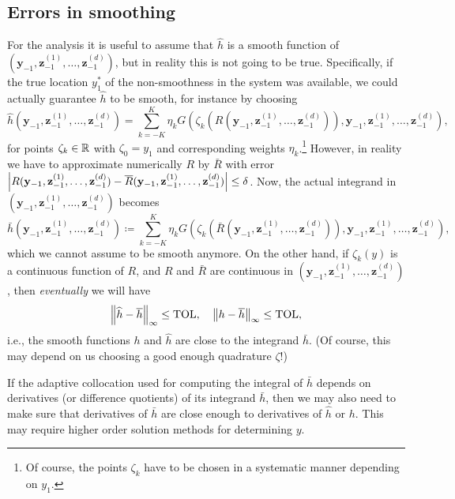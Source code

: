 \subsection{Errors in smoothing}
\label{sec:errors-smoothing}

For the analysis it is useful to assume that $\hat{h}$ is a smooth function of $(\mathbf{y}_{-1},\mathbf{z}^{(1)}_{-1},\dots,\mathbf{z}^{(d)}_{-1} )$, but in reality this is not going to be true. Specifically, if the true location $y_1^\ast$ of the non-smoothness in the system was available, we could actually guarantee $\hat{h}$ to be smooth, for instance by choosing 
\begin{equation*}
	\hat{h}(\mathbf{y}_{-1},\mathbf{z}^{(1)}_{-1},\dots,\mathbf{z}^{(d)}_{-1}  ) = \sum_{k=-K}^{K} \eta_k G\left( \zeta_k(R(\mathbf{y}_{-1},\mathbf{z}^{(1)}_{-1},\dots,\mathbf{z}^{(d)}_{-1} )),
	\mathbf{y}_{-1},\mathbf{z}^{(1)}_{-1},\dots,\mathbf{z}^{(d)}_{-1}   \right),
\end{equation*}
for points $\zeta_k \in \mathbb{R}$ with $\zeta_0 = y_1$ and corresponding weights
$\eta_k$.\footnote{Of course, the points $\zeta_k$ have to be chosen in a
	systematic manner depending on $y_1$.} However, in reality we have to approximate numerically $R$ by $\bar{R}$ with error
$\left\lvert R(\mathbf{y}_{-1},\mathbf{z}^{(1)}_{-1},\dots,\mathbf{z}^{(d)}_{-1}) - \overline{R}(\mathbf{y}_{-1},\mathbf{z}^{(1)}_{-1},\dots,\mathbf{z}^{(d)}_{-1}  )\right\rvert \le \delta$. Now, the actual integrand in $(\mathbf{y}_{-1},\mathbf{z}^{(1)}_{-1},\dots,\mathbf{z}^{(d)}_{-1})$ becomes 
\begin{equation*}
	\bar{h}(\mathbf{y}_{-1},\mathbf{z}^{(1)}_{-1},\dots,\mathbf{z}^{(d)}_{-1}  ) \coloneqq \sum_{k=-K}^{K} \eta_k G\left( \zeta_k(\bar{R}(\mathbf{y}_{-1},\mathbf{z}^{(1)}_{-1},\dots,\mathbf{z}^{(d)}_{-1} )),
	\mathbf{y}_{-1},\mathbf{z}^{(1)}_{-1},\dots,\mathbf{z}^{(d)}_{-1}   \right),
\end{equation*}
which we cannot assume to be smooth anymore. On the other hand, if
$\zeta_k(y)$ is a continuous function of $R$, and $R$ and $\bar{R}$ are continuous in $(\mathbf{y}_{-1},\mathbf{z}^{(1)}_{-1},\dots,\mathbf{z}^{(d)}_{-1}  )$, then \emph{eventually} we will have
\begin{equation*}
	\left\lVert\widehat{h} - \overline{h}\right\rVert_\infty \le \mathrm{TOL}, \quad \left\lVert h - \overline{h}\right\rVert_\infty
	\le \mathrm{TOL}, 
\end{equation*}
i.e., the smooth functions $h$ and $\hat{h}$ are close to the integrand $\bar{h}$. (Of course, this may depend on us choosing a good enough quadrature
$\zeta$!) 
\begin{remark}
	If the adaptive collocation used for computing the integral of $\bar{h}$
	depends on derivatives (or difference quotients) of its integrand $\bar{h}$,
	then we may also need to make sure that derivatives of $\bar{h}$ are close
	enough to derivatives of $\hat{h}$ or $h$. This may require higher order
	solution methods for determining $y$.
\end{remark}

